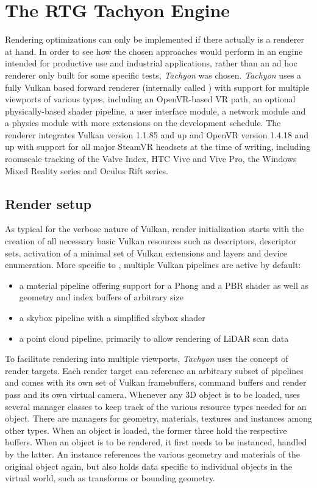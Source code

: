 
\chapter{The \gls{RTG} \gls{Tachyon} Engine} \label{Tachyon}

Rendering optimizations can only be implemented if there actually is a renderer at hand. In order to see how the chosen approaches would perform in an engine intended for productive use and industrial applications, rather than an ad hoc renderer only built for some specific tests, \textit{\gls{Tachyon}} was chosen. \textit{\gls{Tachyon}} uses a fully Vulkan based forward renderer (internally called ) with support for multiple viewports of various types, including an \gls{OpenVR}-based \gls{VR} path, an optional physically-based shader pipeline, a user interface module, a network module and a physics module with more extensions on the development schedule. The renderer integrates Vulkan version 1.1.85 and up and \gls{OpenVR} version 1.4.18 and up with support for all major SteamVR headsets at the time of writing, including roomscale tracking of the Valve Index, HTC Vive and Vive Pro, the Windows Mixed Reality series and Oculus Rift series. 

\section{Render setup} 
As typical for the verbose nature of Vulkan, render initialization starts with the creation of all necessary basic Vulkan resources such as descriptors, descriptor sets, activation of a minimal set of Vulkan extensions and layers and device enumeration. 
More specific to , multiple Vulkan pipelines are active by default:
\begin{itemize}
\item a material pipeline offering support for a Phong and a PBR shader as well as geometry and index buffers of arbitrary size
\item a skybox pipeline with a simplified skybox shader
\item a point cloud pipeline, primarily to allow rendering of LiDAR scan data
\end{itemize}
To facilitate rendering into multiple viewports, \textit{\gls{Tachyon}} uses the concept of render targets. Each render target can reference an arbitrary subset of pipelines and comes with its own set of Vulkan framebuffers, command buffers and render pass and its own virtual camera. 
Whenever any 3D object is to be loaded,  uses several manager classes to keep track of the various resource types needed for an object. There are managers for geometry, materials, textures and instances among other types. When an object is loaded, the former three hold the respective buffers. When an object is to be rendered, it first needs to be instanced, handled by the latter. An instance references the various geometry and materials of the original object again, but also holds data specific to individual objects in the virtual world, such as transforms or bounding geometry. 

